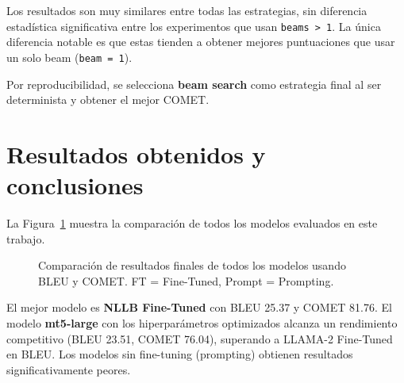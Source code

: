 \documentclass[11pt,spanish,listoffigures,listoftables]{tfgetsinf}
\begin{document}
Los resultados son muy similares entre todas las estrategias, sin diferencia estadística significativa entre los experimentos que usan \texttt{beams > 1}. La única diferencia notable es que estas tienden a obtener mejores puntuaciones que usar un solo beam (\texttt{beam = 1}).

Por reproducibilidad, se selecciona \textbf{beam search} como estrategia final al ser determinista y obtener el mejor COMET.

\section{Resultados obtenidos y conclusiones}
La Figura~\ref{fig:resultados_finales} muestra la comparación de todos los modelos evaluados en este trabajo.

\begin{figure}[H]
\centering
{}
\caption{Comparación de resultados finales de todos los modelos usando BLEU y COMET. FT = Fine-Tuned, Prompt = Prompting.}
\label{fig:resultados_finales}
\end{figure}


\noindent El mejor modelo es \textbf{NLLB Fine-Tuned} con BLEU 25.37 y COMET 81.76. El modelo \textbf{mt5-large} con los hiperparámetros optimizados alcanza un rendimiento competitivo (BLEU 23.51, COMET 76.04), superando a LLAMA-2 Fine-Tuned en BLEU. Los modelos sin fine-tuning (prompting) obtienen resultados significativamente peores.
\end{document}
